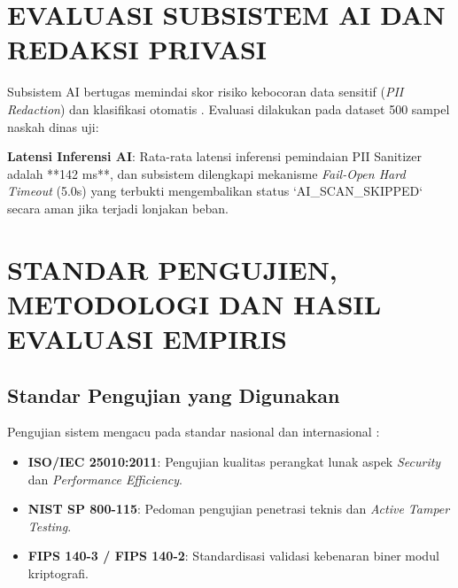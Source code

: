 \documentclass[conference]{IEEEtran}
\begin{document}
\section{EVALUASI SUBSISTEM AI DAN REDAKSI PRIVASI}

Subsistem AI bertugas memindai skor risiko kebocoran data sensitif (\textit{PII Redaction}) dan klasifikasi otomatis \cite{indobert2020}. Evaluasi dilakukan pada dataset 500 sampel naskah dinas uji:

\begin{table}[htbp]
\caption{Metrik Evaluasi Performa Classification \& PII Redaction AI}
\label{tab:ai_metrics}
\centering
{}
\end{table}

\textbf{Latensi Inferensi AI}: Rata-rata latensi inferensi pemindaian PII Sanitizer adalah **142 ms**, dan subsistem dilengkapi mekanisme \textit{Fail-Open Hard Timeout} (5.0s) yang terbukti mengembalikan status `AI_SCAN_SKIPPED` secara aman jika terjadi lonjakan beban.

\section{STANDAR PENGUJIEN, METODOLOGI DAN HASIL EVALUASI EMPIRIS}

\subsection{Standar Pengujian yang Digunakan}
Pengujian sistem mengacu pada standar nasional dan internasional \cite{iso25010, nist800115, iso27034}:
\begin{itemize}
    \item \textbf{ISO/IEC 25010:2011}: Pengujian kualitas perangkat lunak aspek \textit{Security} dan \textit{Performance Efficiency}.
    \item \textbf{NIST SP 800-115}: Pedoman pengujian penetrasi teknis dan \textit{Active Tamper Testing}.
    \item \textbf{FIPS 140-3 / FIPS 140-2}: Standardisasi validasi kebenaran biner modul kriptografi.
\end{itemize}
\end{document}
